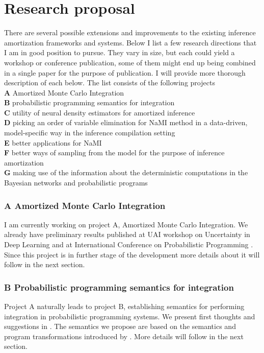 \documentclass[12pt]{article}
\begin{document}
\section{Research proposal}
There are several possible extensions and improvements to the existing inference amortization frameworks and systems. 
Below I list a few research directions that I am in good position to pursue.
They vary in size, but each could yield a workshop or conference publication, some of them might end up being combined in a single paper for the purpose of publication.
I will provide more thorough description of each below.
The list consists of the following projects\\
\textbf{A} \quad Amortized Monte Carlo Integration\\
\textbf{B} \quad probabilistic programming semantics for integration\\
\textbf{C} \quad utility of neural density estimators for amortized inference\\
\textbf{D} \quad picking an order of variable elimination for NaMI method in a data-driven, model-specific way in the inference compilation setting\\
\textbf{E} \quad better applications for NaMI\\
\textbf{F} \quad better ways of sampling from the model for the purpose of inference amortization\\
\textbf{G} \quad making use of the information about the deterministic computations in the Bayesian networks and probabilistic programs\\


\subsubsection*{A \quad Amortized Monte Carlo Integration}
I am currently working on project A, Amortized Monte Carlo Integration. 
We already have preliminary results published at UAI workshop on Uncertainty in Deep Learning \citep{golinski2018uai} and at International Conference on Probabilistic Programming \citep{golinski2018probprog}. 
Since this project is in further stage of the development more details about it will follow in the next section.
 

\subsubsection*{B \quad Probabilistic programming semantics for integration}
Project A naturally leads to project B, establishing semantics for performing integration in probabilistic programming systems.
We present first thoughts and suggestions in \citep{golinski2018probprog}.
The semantics we propose are based on the semantics and program transformations introduced by \citet{rainforth2016bopp}.
More details will follow in the next section.
\end{document}
